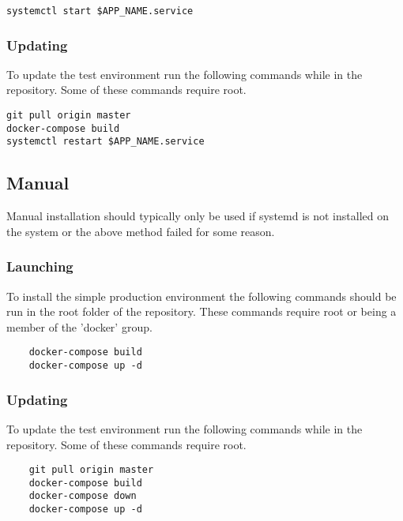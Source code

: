 \begin{verbatim}
systemctl start $APP_NAME.service
\end{verbatim}

\subsubsection{Updating}

To update the test environment run the following commands while in the repository.  Some of these commands require root.

\begin{verbatim}
git pull origin master
docker-compose build
systemctl restart $APP_NAME.service
\end{verbatim}

\subsection{Manual}

Manual installation should typically only be used if systemd is not installed on the system or the above method failed for some reason.

\subsubsection{Launching}

To install the simple production environment the following commands should be run in the root folder of the repository.  These commands require root or being a member of the 'docker' group.

\begin{verbatim}
	docker-compose build
	docker-compose up -d
\end{verbatim}

\subsubsection{Updating}

To update the test environment run the following commands while in the repository.  Some of these commands require root.

\begin{verbatim}
	git pull origin master
	docker-compose build
	docker-compose down
	docker-compose up -d
\end{verbatim}
